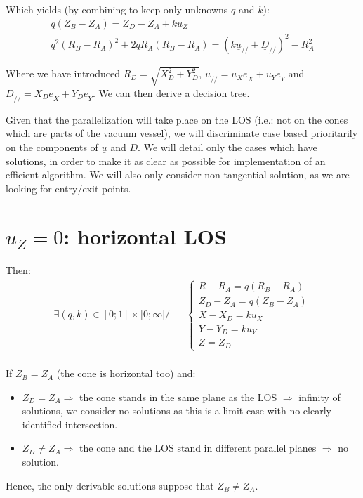 \documentclass[a4paper,11pt,twoside,titlepage,openright]{book}
\numberwithin{equation}{section}
\newcommand{\ud}[1]{\underline{#1}}
\begin{document}
Which yields (by combining to keep only unknowns $q$ and $k$):
$$
\begin{array}{cc}
q(Z_B-Z_A) = Z_D-Z_A + ku_Z\\
q^2(R_B-R_A)^2 + 2qR_A(R_B-R_A) = \left(k\ud{u}_{//} + \ud{D}_{//}\right)^2 - R_A^2
\end{array}
$$

Where we have introduced $R_D = \sqrt{X_D^2+Y_D^2}$, $\ud{u}_{//} = u_X\ud{e}_X+u_Y\ud{e}_Y$ and $\ud{D}_{//} = X_D\ud{e}_X + Y_D\ud{e}_Y$.
We can then derive a decision tree.


Given that the parallelization will take place on the LOS (i.e.: not on the cones which are parts of the vacuum vessel), we will discriminate case based prioritarily on the components of $\ud{u}$ and $D$.
We will detail only the cases which have solutions, in order to make it as clear as possible for implementation of an efficient algorithm.
We will also only consider non-tangential solution, as we are looking for entry/exit points.

\section{$u_Z=0$: horizontal LOS}

Then:
$$
\begin{array}{lll}
\exists (q,k) \in [0;1]\times [0;\infty[ /& &
\left\{\begin{array}{ll}
R-R_A = q(R_B-R_A)\\
Z_D-Z_A = q(Z_B-Z_A)\\
X-X_D = ku_X\\
Y-Y_D = ku_Y\\
Z=Z_D
\end{array}\right.\\
\end{array}
$$

If $Z_B=Z_A$ (the cone is horizontal too) and:
\begin{itemize}
\item $Z_D=Z_A \Rightarrow$ the cone stands in the same plane as the LOS $\Rightarrow$ infinity of solutions, we consider no solutions as this is a limit case with no clearly identified intersection.
\item $Z_D\neq Z_A \Rightarrow$ the cone and the LOS stand in different parallel planes $\Rightarrow$ no solution.
\end{itemize}

Hence, the only derivable solutions suppose that $Z_B\neq Z_A$.
\end{document}
